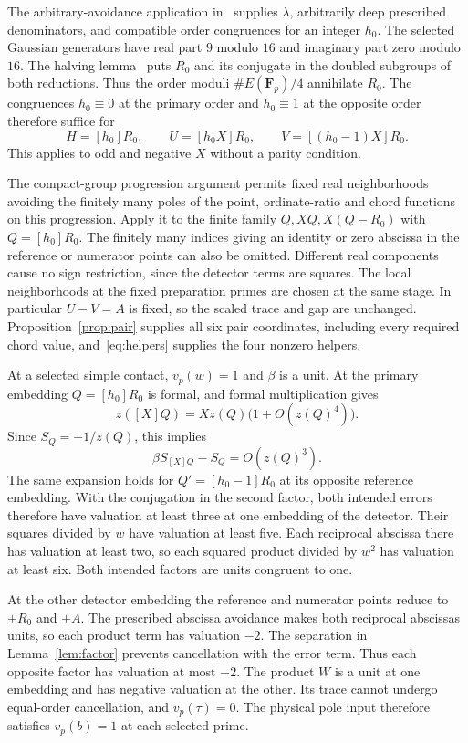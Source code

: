 \documentclass[11pt,a4paper]{article}
\begin{document}
The arbitrary-avoidance application in~\cite[Section~2]{Primes}
supplies $\lambda$, arbitrarily deep prescribed denominators, and
compatible order congruences for an integer $h_0$. The selected
Gaussian generators have real part $9$ modulo $16$ and imaginary
part zero modulo $16$. The halving lemma~\cite[Section~5]{Half}
puts $R_0$ and its conjugate in the doubled subgroups of both
reductions. Thus the order moduli $\#E(\mathbf F_p)/4$ annihilate
$R_0$. The congruences $h_0\equiv0$ at the primary order and
$h_0\equiv1$ at the opposite order therefore suffice for
\[
 H=[h_0]R_0,\qquad U=[h_0X]R_0,\qquad V=[(h_0-1)X]R_0.
\]
This applies to odd and negative $X$ without a parity condition.

The compact-group progression argument permits fixed real
neighborhoods avoiding the finitely many poles of the point,
ordinate-ratio and chord functions on this progression. Apply it
to the finite family $Q,XQ,X(Q-R_0)$ with $Q=[h_0]R_0$.
The finitely many indices giving an identity or zero abscissa in
the reference or numerator points can also be omitted. Different
real components cause no sign restriction, since the detector
terms are squares. The local neighborhoods at the fixed
preparation primes are chosen at the same stage. In particular
$U-V=A$ is fixed, so the scaled trace and gap are unchanged.
Proposition~\ref{prop:pair} supplies all six pair coordinates,
including every required chord value, and~\eqref{eq:helpers}
supplies the four nonzero helpers.

At a selected simple contact, $v_p(w)=1$ and $\beta$ is a unit.
At the primary embedding $Q=[h_0]R_0$ is formal, and formal
multiplication gives
\[
             z([X]Q)=Xz(Q)\bigl(1+O(z(Q)^4)\bigr).
\]
Since $S_Q=-1/z(Q)$, this implies
\[
                        \beta S_{[X]Q}-S_Q=O(z(Q)^3).
\]
The same expansion holds for $Q'=[h_0-1]R_0$ at its opposite
reference embedding. With the conjugation in the second factor,
both intended errors therefore have valuation at least three
at one embedding of the detector. Their squares divided by $w$
have valuation at least five. Each reciprocal abscissa there has
valuation at least two, so each squared product divided by $w^2$
has valuation at least six. Both intended factors are units
congruent to one.

At the other detector embedding the reference and numerator
points reduce to $\pm R_0$ and $\pm A$. The prescribed abscissa
avoidance makes both reciprocal abscissas units, so each product
term has valuation $-2$. The separation in
Lemma~\ref{lem:factor} prevents cancellation with the error term.
Thus each opposite factor has valuation at most $-2$.
The product $W$ is a unit at one embedding and has negative
valuation at the other. Its trace cannot undergo equal-order
cancellation, and $v_p(\tau)=0$. The physical pole input therefore
satisfies $v_p(b)=1$ at each selected prime.
\end{document}
